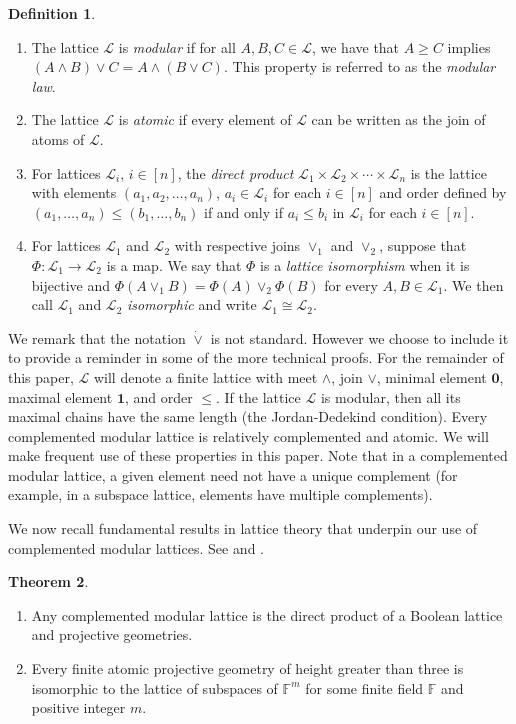 \documentclass[a4paper,11pt,reqno]{article}
\theoremstyle{definition}
\newtheorem{theorem}{Theorem}[section]
\newtheorem{definition}[theorem]{{{Definition}}}
\newcommand{\mL}{\mathcal{L}}
\newcommand{\h}{\textup{h}}
\newcommand{\F}{\mathbb{F}}
\newcommand{\one}{{\mathbf{1}}}
\newcommand{\zero}{{\mathbf{0}}}
\begin{document}
\begin{definition}
\begin{enumerate}
    $\h(A)=|S|$.
    \item The lattice $\mL$ is {\em modular} if for all $A,B,C \in \mL$, we have that
    $A \geq C$ implies $(A \wedge B) \vee C = A \wedge (B \vee C).$ This property is referred to as the \emph{modular law}.
    \item The lattice $\mathcal{L}$ is \emph{atomic} if every element of $\mathcal{L}$ can be written as the join of atoms of $\mathcal{L}$.
    \item For lattices $\mathcal{L}_i$, $i\in [n]$, the \emph{direct product} $\mathcal{L}_1\times \mathcal{L}_2\times\cdots\times \mathcal{L}_n$ is the lattice with elements $(a_1,a_2,\dots,a_n)$, $a_i\in\mathcal{L}_i$ for each $i\in[n]$ and order defined by $(a_1,\dots,a_n)\leq (b_1,\dots,b_n)$ if and only if $a_i\leq b_i$ in $\mathcal{L}_i$ for each $i\in[n]$.
    \item For lattices $\mathcal{L}_1$ and $\mathcal{L}_2$ with respective joins $\vee_1$ and $\vee_2$, suppose that $\Phi:\mathcal{L}_1\to\mathcal{L}_2$ is a map. We say that $\Phi$ is a \emph{lattice isomorphism} when it is bijective and $\Phi(A\vee_1 B)=\Phi(A)\vee_2 \Phi(B)$ for every $A,B\in\mathcal{L}_1$. We then call $\mathcal{L}_1$ and $\mathcal{L}_2$ \emph{isomorphic} and write $\mathcal{L}_1\cong\mathcal{L}_2$.
\end{enumerate}
\end{definition}
We remark that the notation $\dot\vee$ is not standard. However we choose to include it to provide a reminder in some of the more technical proofs.
%
For the remainder of this paper, $\mL$ will denote a finite lattice with meet $\wedge$, join $\vee$, minimal element $\zero$, maximal element $\one$, and order $\leq$. 
If the lattice $\mL$ is modular, then all its maximal chains have the same length (the Jordan-Dedekind condition). 
Every complemented modular lattice is relatively complemented and atomic. We will make frequent use of these properties in this paper. Note that in a complemented modular lattice, a given element need not have a unique complement (for example, in a subspace lattice, elements have multiple complements).


We now recall fundamental results in lattice theory that underpin our use of complemented modular lattices. See {\cite[Chapter IV.6, Theorem 10]{birkhoff_lattice}} and {\cite[Chapter VIII.9, Theorem 20]{birkhoff_lattice}}.
%
\begin{theorem}\label{thm:compmod_is_direct_prod}
    \begin{enumerate}
        \item Any complemented modular lattice is the direct product of a Boolean lattice and projective geometries.
        \item Every finite atomic projective geometry of height greater than three is isomorphic to the lattice of subspaces of $\F^{m}$ for some finite field $\F$ and positive integer $m$.
    \end{enumerate}
\end{theorem}
\end{document}
